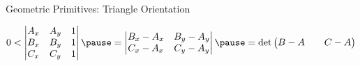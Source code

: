 \documentclass[aspectratio=169,fleqn]{beamer}
\begin{document}
\begin{frame}{Geometric Primitives: Triangle Orientation}
    \pause
    \begin{mybox}
    \[
      0 <
      \begin{vmatrix}
        A_x & A_y & 1 \\
        B_x & B_y & 1 \\
        C_x & C_y & 1 \\
      \end{vmatrix}
      \pause
      =
      \begin{vmatrix}
        B_x - A_x & B_y - A_y \\
        C_x - A_x & C_y - A_y \\
      \end{vmatrix}
      \pause
      =
      \det
      \begin{pmatrix}
        B-A && C-A
      \end{pmatrix}
    \]
    \end{mybox}
  \end{frame}
\end{document}
